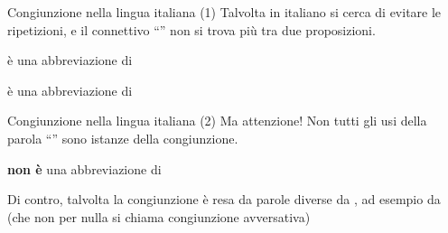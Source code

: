 \documentclass[aspectratio=169,10pt,dvipsnames,handout]{beamer}
\begin{document}
\begin{frame}{Congiunzione nella lingua italiana (1)}
    Talvolta in italiano si cerca di evitare le ripetizioni, e il connettivo ``'' non si trova più tra due proposizioni.

    \begin{example}
        \medskip

        \pause
        \hspace{2cm} è una abbreviazione di\medskip

    \end{example}

    \pause
    \begin{example}
        \medskip

        \pause
        \hspace{2cm} è una abbreviazione di\medskip

    \end{example}
\end{frame}

\begin{frame}{Congiunzione nella lingua italiana (2)}
    Ma attenzione! Non tutti gli usi della parola ``'' sono istanze della congiunzione.
    \begin{example}
        \medskip

        \pause
        \hspace{2cm} \textbf{non è} una abbreviazione di\medskip

        \medskip
    \end{example}

    \pause
    \medskip
    Di contro, talvolta la congiunzione è resa da parole diverse da , ad esempio da  (che non per nulla si chiama \alert{congiunzione avversativa})

    \begin{example}
    \end{example}
\end{frame}
\end{document}
